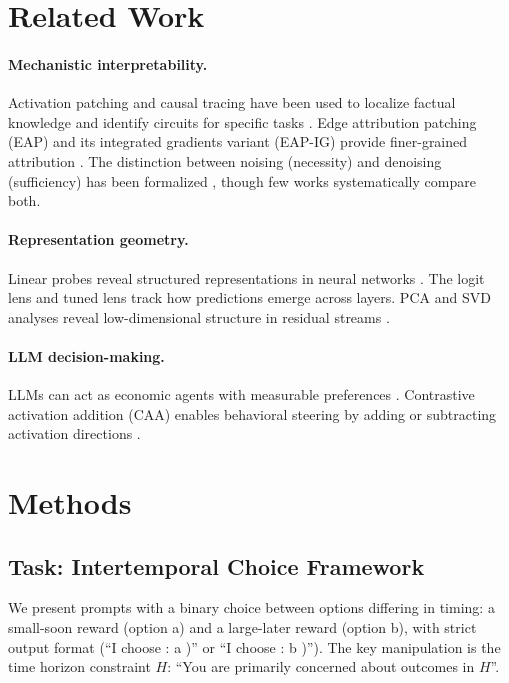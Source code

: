\documentclass{article}
\begin{document}
\section{Related Work}

\paragraph{Mechanistic interpretability.} Activation patching and causal tracing have been used to localize factual knowledge \citep{meng2022locating} and identify circuits for specific tasks \citep{wang2022interpretability, conmy2023towards}. Edge attribution patching (EAP) and its integrated gradients variant (EAP-IG) provide finer-grained attribution \citep{syed2023attribution}. The distinction between noising (necessity) and denoising (sufficiency) has been formalized \citep{chan2022causal, geiger2021causal}, though few works systematically compare both.

\paragraph{Representation geometry.} Linear probes reveal structured representations in neural networks \citep{belinkov2022probing}. The logit lens \citep{nostalgebraist2020logit} and tuned lens \citep{belrose2023eliciting} track how predictions emerge across layers. PCA and SVD analyses reveal low-dimensional structure in residual streams \citep{elhage2022toy}.

\paragraph{LLM decision-making.} LLMs can act as economic agents with measurable preferences \citep{horton2023large, brand2023using}. Contrastive activation addition (CAA) enables behavioral steering by adding or subtracting activation directions \citep{turner2023activation, rimsky2023steering}.

\section{Methods}

\subsection{Task: Intertemporal Choice Framework}

We present prompts with a binary choice between options differing in timing: a small-soon reward (option a) and a large-later reward (option b), with strict output format (``I choose : a )'' or ``I choose : b )''). The key manipulation is the time horizon constraint $H$: ``You are primarily concerned about outcomes in $H$''.
\end{document}
